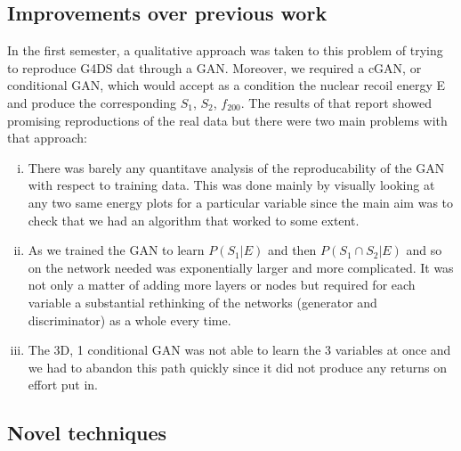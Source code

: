 \documentclass[11pt]{article} %
\begin{document}
\subsection{Improvements over previous work}
In the first semester, a qualitative approach was taken to this problem of trying to reproduce G4DS dat through a GAN.
Moreover, we required a cGAN, or conditional GAN, which would accept as a condition the nuclear recoil energy E and produce the corresponding $S_1$, $S_2$, $f_200$.
The results of that report showed promising reproductions of the real data but there were two main problems with that approach:
\begin{enumerate}[i)]
  \item There was barely any quantitave analysis of the reproducability of the GAN with respect to training data.
  This was done mainly by visually looking at any two same energy plots for a particular variable since the main aim was to check that we had an algorithm that worked to some extent.
  \item As we trained the GAN to learn $P(S_1|E)$ and then $P(S_1 \cap S_2|E)$ and so on the network needed was exponentially larger and more complicated.
  It was not only a matter of adding more layers or nodes but required for each variable a substantial rethinking of the networks (generator and discriminator) as a whole every time.
  \item The 3D, 1 conditional GAN was not able to learn the 3 variables at once and we had to abandon this path quickly since it did not produce any returns on effort put in.
\end{enumerate}
\subsection{Novel techniques}
\end{document}
